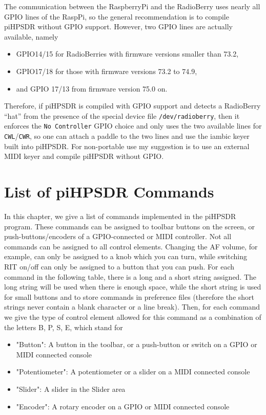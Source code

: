 \documentclass[12pt]{book}
\def\pH{pi\-HPSDR\xspace}
\begin{document}
The communication between the RaspberryPi and the RadioBerry uses nearly all GPIO lines of the
RaspPi, so the general recommendation is to compile \pH without GPIO support. However, two GPIO lines
are actually available, namely
\begin{itemize}
\item{GPIO14/15 for RadioBerries with firmware versions smaller than 73.2,}
\item{GPIO17/18 for those with firmware versions 73.2 to 74.9,}
\item{ and GPIO 17/13 from firmware version 75.0 on.}
\end{itemize}
Therefore, if \pH is compiled with GPIO support and detects a RadioBerry ``hat''
from the presence of the special device file  \texttt{/dev/radioberry},
then it enforces
the \texttt{No Controller} GPIO choice and only uses the two available lines for
\texttt{CWL}/\texttt{CWR}, so one can attach a paddle to the two lines and use the iambic
keyer built into \pH. For non-portable use my suggestion is to use an external MIDI keyer
and compile \pH without GPIO.


\appendix
\chapter{List of \pH Commands}
\label{sec:commandlist}

In this chapter, we give a list of commands implemented in the \pH program. These commands can be
assigned to toolbar buttons on the screen, or push-buttons/encoders of a GPIO-connected or MIDI controller.
Not all commands can be assigned to all control elements. Changing the AF volume, for example, can only be
assigned to a knob
which you can turn, while switching RIT on/off can only be assigned to a button that you can push. For each
command in the following table, there is a long and a short string assigned. The long string will be used
when there is enough space, while the short string is used for small buttons and to store commands in
preference files (therefore the short strings never contain a blank character or a line break). Then, for
each command we give the type of control element allowed for this command as a combination of the letters B,
P, S, E, which stand for

\begin{itemize}[font=\texttt, left=0pt]
\item[B] {"Button": A button in the toolbar, or a push-button or switch on a GPIO or MIDI connected console}
\item[P] {"Potentiometer": A potentiometer or a slider on a MIDI connected console}
\item[S] {"Slider": A slider in the Slider area}
\item[E] {"Encoder": A rotary encoder on a GPIO or MIDI connected console}
\end{itemize}
\end{document}
